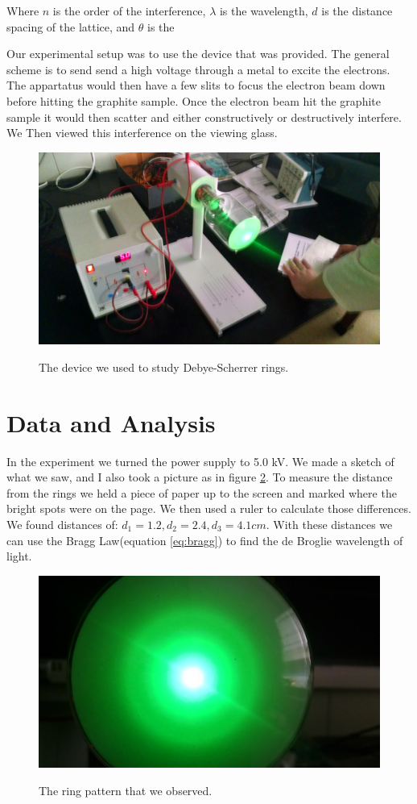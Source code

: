 \documentclass[12pt letterpaper]{article}
\begin{document}
Where $n$ is the order of the interference, $\lambda$ is the wavelength, $d$ is the distance spacing of the lattice, and $\theta$ is the 

Our experimental setup was to use the device that was provided. The general scheme is to send send a high voltage through a metal to excite the electrons. The appartatus would then have a few slits to focus the electron beam down before hitting the graphite sample. Once the electron beam hit the graphite sample it would then scatter and either constructively or destructively interfere. We Then viewed this interference on the viewing glass. 

\begin{figure}[H]
  \caption{The device we used to study Debye-Scherrer rings.}
  \centering
    \includegraphics[width=.75\textwidth]{electron_beam_setup.jpg}
    \label{fig:setup}
\end{figure}

\section*{Data and Analysis}

In the experiment we turned the power supply to 5.0 kV. We made a sketch of what we saw, and I also took a picture as in figure \ref{fig:rings}. To measure the distance from the rings we held a piece of paper up to the screen and marked where the bright spots were on the page. We then used a ruler to calculate those differences. We found distances of: $d_1 = 1.2, d_2 = 2.4, d_3 = 4.1 cm$. With these distances we can use the Bragg Law(equation \ref{eq:bragg}) to find the de Broglie wavelength of light. 
\begin{figure}[H]
  \caption{The ring pattern that we observed.}
  \centering
    \includegraphics[width=.75\textwidth]{debye_scherrer_rings.jpg}
    \label{fig:rings}
\end{figure}
\end{document}
